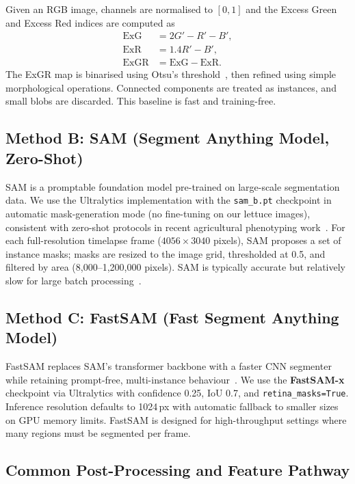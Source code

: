 Given an RGB image, channels are normalised to $[0,1]$ and the Excess Green and Excess Red
indices are computed as
\begin{align}
    \mathrm{ExG}  &= 2G' - R' - B', \\
    \mathrm{ExR}  &= 1.4R' - B', \\
    \mathrm{ExGR} &= \mathrm{ExG} - \mathrm{ExR}.
    \label{eq:exgr}
\end{align}
The ExGR map is binarised using Otsu's threshold~\cite{otsu1979}, then refined using simple
morphological operations. Connected components are treated as instances, and small blobs are
discarded. This baseline is fast and training-free.

\subsection{Method B: SAM (Segment Anything Model, Zero-Shot)}
\label{sec:methods_sam}

SAM is a promptable foundation model pre-trained on large-scale segmentation data.
We use the Ultralytics implementation with the \texttt{sam\_b.pt} checkpoint in automatic
mask-generation mode (no fine-tuning on our lettuce images), consistent with zero-shot
protocols in recent agricultural phenotyping work~\cite{cornell2024}.
For each full-resolution timelapse frame ($4056 \times 3040$ pixels), SAM proposes a set of
instance masks; masks are resized to the image grid, thresholded at 0.5, and filtered by area
(8{,}000--1{,}200{,}000 pixels).
SAM is typically accurate but relatively slow for large batch processing~\cite{cornell2024}.

\subsection{Method C: FastSAM (Fast Segment Anything Model)}
\label{sec:methods_fastsam}

FastSAM replaces SAM's transformer backbone with a faster CNN segmenter while retaining
prompt-free, multi-instance behaviour~\cite{zhao2023fastsam}.
We use the \textbf{FastSAM-x} checkpoint via Ultralytics with confidence 0.25, IoU 0.7, and
\texttt{retina\_masks=True}.
Inference resolution defaults to 1024\,px with automatic fallback to smaller sizes on GPU
memory limits.
FastSAM is designed for high-throughput settings where many regions must be segmented per
frame.

\subsection{Common Post-Processing and Feature Pathway}
\label{sec:methods_postprocess}

